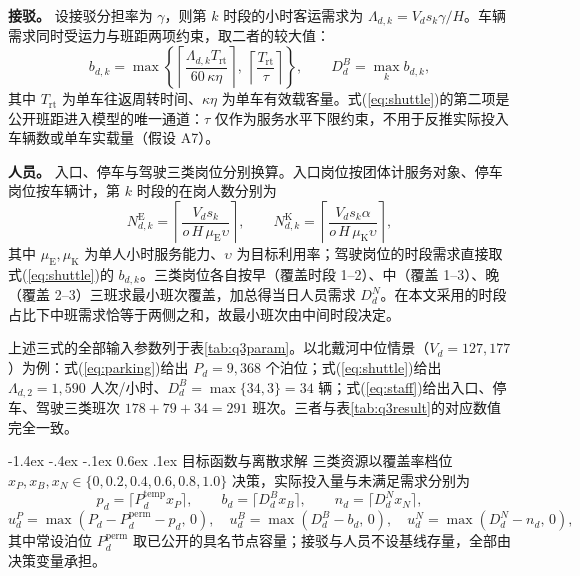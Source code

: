 \documentclass[withoutpreface,bwprint]{cumcmthesis}
\makeatletter
\renewcommand\subsubsection{\@startsection{subsubsection}{3}{\z@}%
  {-1.4ex \@plus -.4ex \@minus -.1ex}%
  {0.6ex \@plus .1ex}%
  {\normalfont\normalsize\bfseries}}
\makeatother
\begin{document}
\textbf{接驳。} 设接驳分担率为 $\gamma$，则第 $k$ 时段的小时客运需求为 $\Lambda_{d,k}=V_ds_k\gamma/H$。车辆需求同时受运力与班距两项约束，取二者的较大值：
\begin{equation}\label{eq:shuttle}
b_{d,k}=\max\left\{\left\lceil\frac{\Lambda_{d,k}T_{\mathrm{rt}}}{60\,\kappa\eta}\right\rceil,\ \left\lceil\frac{T_{\mathrm{rt}}}{\tau}\right\rceil\right\},\qquad D_d^{B}=\max_k b_{d,k},
\end{equation}
其中 $T_{\mathrm{rt}}$ 为单车往返周转时间、$\kappa\eta$ 为单车有效载客量。式(\ref{eq:shuttle})的第二项是公开班距进入模型的唯一通道：$\tau$ 仅作为服务水平下限约束，不用于反推实际投入车辆数或单车实载量（假设 A7）。

\textbf{人员。} 入口、停车与驾驶三类岗位分别换算。入口岗位按团体计服务对象、停车岗位按车辆计，第 $k$ 时段的在岗人数分别为
\begin{equation}\label{eq:staff}
N_{d,k}^{\mathrm{E}}=\left\lceil\frac{V_ds_k}{o\,H\,\mu_{\mathrm{E}}\upsilon}\right\rceil,\qquad
N_{d,k}^{\mathrm{K}}=\left\lceil\frac{V_ds_k\alpha}{o\,H\,\mu_{\mathrm{K}}\upsilon}\right\rceil,
\end{equation}
其中 $\mu_{\mathrm{E}},\mu_{\mathrm{K}}$ 为单人小时服务能力、$\upsilon$ 为目标利用率；驾驶岗位的时段需求直接取式(\ref{eq:shuttle})的 $b_{d,k}$。三类岗位各自按早（覆盖时段 1--2）、中（覆盖 1--3）、晚（覆盖 2--3）三班求最小班次覆盖，加总得当日人员需求 $D_d^{N}$。在本文采用的时段占比下中班需求恰等于两侧之和，故最小班次由中间时段决定。

上述三式的全部输入参数列于表\ref{tab:q3param}。以北戴河中位情景（$V_d=127{,}177$）为例：式(\ref{eq:parking})给出 $P_d=9{,}368$ 个泊位；式(\ref{eq:shuttle})给出 $\Lambda_{d,2}=1{,}590$ 人次/小时、$D_d^{B}=\max\{34,3\}=34$ 辆；式(\ref{eq:staff})给出入口、停车、驾驶三类班次 $178+79+34=291$ 班次。三者与表\ref{tab:q3result}的对应数值完全一致。

\subsubsection{目标函数与离散求解}
三类资源以覆盖率档位 $x_P,x_B,x_N\in\{0,0.2,0.4,0.6,0.8,1.0\}$ 决策，实际投入量与未满足需求分别为
\begin{equation}
p_d=\lceil P_d^{\mathrm{temp}}x_P\rceil,\qquad b_d=\lceil D_d^{B}x_B\rceil,\qquad n_d=\lceil D_d^{N}x_N\rceil,
\end{equation}
\begin{equation}\label{eq:gap}
u_d^{P}=\max(P_d-P_d^{\mathrm{perm}}-p_d,\,0),\quad
u_d^{B}=\max(D_d^{B}-b_d,\,0),\quad
u_d^{N}=\max(D_d^{N}-n_d,\,0),
\end{equation}
其中常设泊位 $P_d^{\mathrm{perm}}$ 取已公开的具名节点容量；接驳与人员不设基线存量，全部由决策变量承担。
\end{document}
